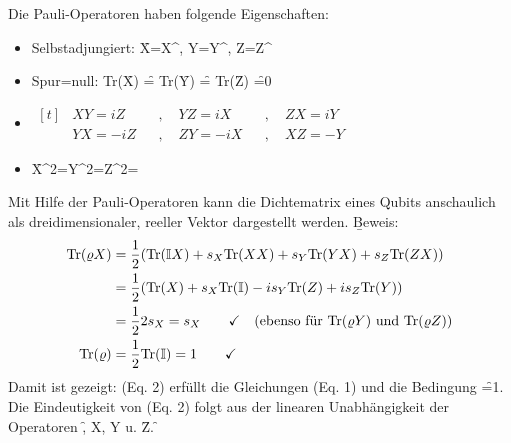 Die Pauli-Operatoren haben folgende Eigenschaften:
\begin{itemize}
    \item Selbstadjungiert: \f{X=X^\dagger, Y=Y^\dagger, Z=Z^\dagger}
    \item Spur=null: Tr(\f{X}) \f{=} Tr(\f{Y}) \f{=} Tr(\f{Z}) \f{=0}
    \item $\begin{aligned}[t]
        & XY=iZ   && , \quad YZ=iX   && , \quad ZX=iY \\
        & YX=-iZ  && , \quad ZY=-iX  && , \quad XZ=-Y
    \end{aligned}$
    \item \f{X^2=Y^2=Z^2=}
\end{itemize}
Mit Hilfe der Pauli-Operatoren kann die Dichtematrix eines Qubits anschaulich als dreidimensionaler, reeller Vektor dargestellt werden.
\b{Beweis:}
\begin{align*}
    \text{Tr}(\varrho X) &= \frac{1}{2}(\text{Tr}(\mathbb{I}X)+ s_X\text{Tr}(XX)+s_Y\text{Tr}(YX)+s_Z\text{Tr}(ZX))\\
    &= \frac{1}{2}(\text{Tr}(X) + s_X\text{Tr}(\mathbb{I}) - is_Y\text{Tr}(Z) + is_Z\text{Tr}(Y)) \\
    &= \frac{1}{2}2s_X = s_X\qquad\checkmark\quad\text{(ebenso für ${\text{Tr}(\varrho Y)}$ und ${\text{Tr}(\varrho Z)}$)}\\
    \text{Tr}(\varrho) &= \frac{1}{2}\text{Tr}(\mathbb{I}) = 1\qquad\checkmark
\end{align*}
Damit ist gezeigt: (Eq. 2) erfüllt die Gleichungen (Eq. 1) und die Bedingung \f{\tr{\varrho}=1}.\\
Die Eindeutigkeit von (Eq. 2) folgt aus der linearen Unabhängigkeit der Operatoren \f{, X, Y} u. \f{Z}. \f{\square}
\vspace{0.5cm}

